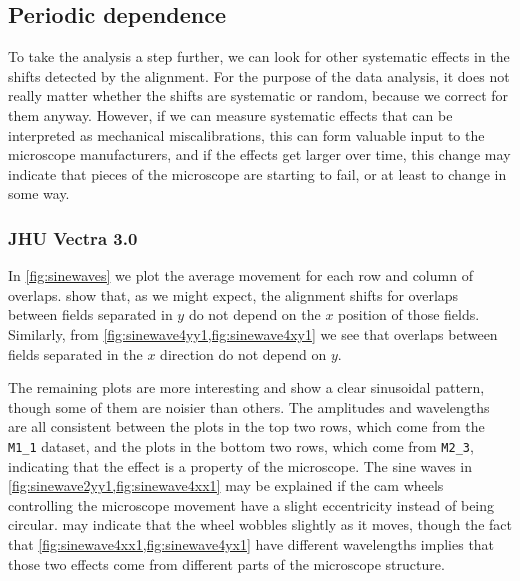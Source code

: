 \documentclass{article}
\newcommand{\M}[2]{\texttt{M#1\_#2}}
\begin{document}
\clearpage

\subsection{Periodic dependence}
\label{sec:vectraperiodic}

To take the analysis a step further, we can look for other systematic effects in the shifts detected by the alignment.  For the purpose of the data analysis, it does not really matter whether the shifts are systematic or random, because we correct for them anyway.  However, if we can measure systematic effects that can be interpreted as mechanical miscalibrations, this can form valuable input to the microscope manufacturers, and if the effects get larger over time, this change may indicate that pieces of the microscope are starting to fail, or at least to change in some way.

\subsubsection{JHU Vectra 3.0}

In \cref{fig:sinewaves} we plot the average movement for each row and column of overlaps.   show that, as we might expect, the alignment shifts for overlaps between fields separated in $y$ do not depend on the $x$ position of those fields.  Similarly, from \cref{fig:sinewave4yy1,fig:sinewave4xy1} we see that overlaps between fields separated in the $x$ direction do not depend on $y$.

The remaining plots are more interesting and show a clear sinusoidal pattern, though some of them are noisier than others.  The amplitudes and wavelengths are all consistent between the plots in the top two rows, which come from the \M11 dataset, and the plots in the bottom two rows, which come from \M23, indicating that the effect is a property of the microscope.  The sine waves in \cref{fig:sinewave2yy1,fig:sinewave4xx1} may be explained if the cam wheels controlling the microscope movement have a slight eccentricity instead of being circular.   may indicate that the wheel wobbles slightly as it moves, though the fact that \cref{fig:sinewave4xx1,fig:sinewave4yx1} have different wavelengths implies that those two effects come from different parts of the microscope structure.
\end{document}
